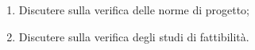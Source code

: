 \begin{enumerate}
    \item Discutere sulla verifica delle norme di progetto;
    \item Discutere sulla verifica degli studi di fattibilità.
\end{enumerate}